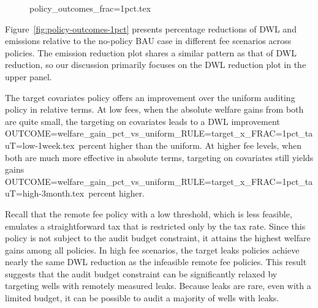 \documentclass[12pt,oneside,letterpaper]{article}
\theoremstyle{definition}
\begin{document}
\begin{refsection}
\begin{figure}[!bth] %
{policy_outcomes_frac=1pct.tex}
\end{figure}


Figure~\ref{fig:policy-outcomes-1pct} presents percentage reductions of \gls{DWL} and emissions relative to the no-policy \gls{BAU} case in different fee scenarios across policies.
The emission reduction plot shares a similar pattern as that of \gls{DWL} reduction, so our discussion primarily focuses on the \gls{DWL} reduction plot in the upper panel.

The target covariates policy offers an improvement over the uniform auditing policy in relative terms.
At low fees, when the absolute welfare gains from both are quite small, the
targeting on covariates leads to a \gls{DWL} improvement
{OUTCOME=welfare_gain_pct_vs_uniform_RULE=target_x_FRAC=1pct_tauT=low-1week.tex}~percent
higher than the uniform.
At higher fee levels, when both are much more effective in absolute terms, targeting on covariates still yields gains
{OUTCOME=welfare_gain_pct_vs_uniform_RULE=target_x_FRAC=1pct_tauT=high-3month.tex}~percent
higher.

Recall that the remote fee policy with a low threshold, which is less feasible, emulates a straightforward tax that is restricted only by the tax rate.
Since this policy is not subject to the audit budget constraint, it attains the highest welfare gains among all policies.
In high fee scenarios, the target leaks policies achieve nearly the same \gls{DWL} reduction as the infeasible remote fee policies.
This result suggests that the audit budget constraint can be significantly relaxed by targeting wells with remotely measured leaks.
Because leaks are rare, even with a limited budget, it can be possible to audit a majority of wells with leaks.


\end{refsection}
\end{document}
